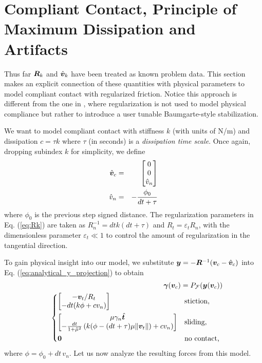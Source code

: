 \section{Compliant Contact, Principle of Maximum Dissipation and Artifacts}
\label{sec:physical_intuition}

Thus far ${\bm{R}}_k$ and $\hat{{\bm{v}}}_k$ have been treated as known problem
data. This section makes an explicit connection of these quantities with
physical parameters to model compliant contact with regularized friction. Notice
this approach is different from the one in \cite{bib:todorov2014}, where
regularization is not used to model physical compliance but rather to introduce
a user tunable Baumgarte-style stabilization.

We want to model compliant contact with stiffness $k$ (with units of N/m) and
dissipation $c = \tau k$ where $\tau$ (in seconds) is a \textit{dissipation time
scale}. Once again, dropping subindex $k$ for simplicity, we define
\begin{eqnarray}
	\hat{{\bm{v}}}_c &=&
	\begin{bmatrix}
		0\\
		0\\
		\hat{v}_n \end{bmatrix}\nonumber\\
	\hat{v}_n &=& -\frac{\phi_0}{dt+\tau}
\end{eqnarray}
where $\phi_0$ is the previous step signed distance. The regularization
parameters in Eq. (\ref{eq:Rk}) are taken as $R_n^{-1} = dt k(dt+\tau)$ and
$R_t=\varepsilon_t R_n$, with the dimensionless parameter $\varepsilon_t \ll 1$
to control the amount of regularization in the tangential direction.

To gain physical insight into our model, we
substitute ${\bm{y}}=-{\bm{R}}^{-1}({\bm{v}}_c - \hat{{\bm{v}}}_c)$ into Eq.
(\ref{eq:analytical_y_projection}) to obtain
\begin{eqnarray}
	&&\bgamma(\vf{v}_c) = P_\mathcal{F}(\vf{y}(\vf{v}_c))
    \label{eq:gamma_analytical_from_vc}\\
&&\begin{dcases}
	\begin{bmatrix}
		-\vf{v}_t/R_t\\
		-dt(k\phi + c v_n)
	\end{bmatrix}
	& \text{stiction, } \\
	\begin{bmatrix}
		\mu\gamma_n\hat{\vf{t}}\\
		-\frac{dt}{1+\tilde\mu^2}\left(k(\phi-(dt+\tau)\mu\Vert\vf{v}_t\Vert) + cv_n \right)
	\end{bmatrix}
	& \text{sliding, }\\
    \vf{0} & \text{no contact, }
\end{dcases}\nonumber	
\end{eqnarray}
where $\phi= \phi_0 + dt\,v_n$. Let us now analyze the resulting forces from
this model.

